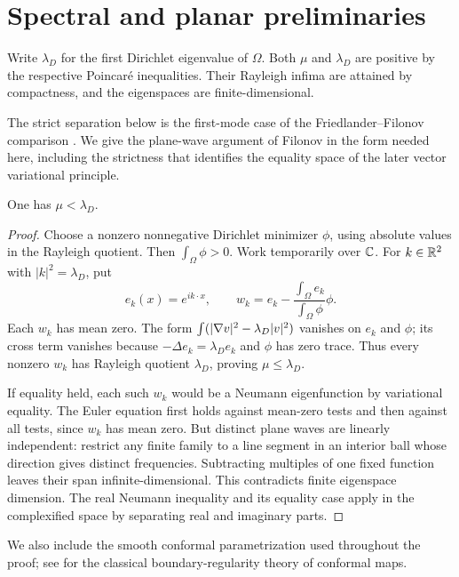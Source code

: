 \section{Spectral and planar preliminaries}\label{sec:preliminaries}

Write $\lambda_D$ for the first Dirichlet eigenvalue of $\Omega$. Both $\mu$ and $\lambda_D$ are positive by the respective Poincar\'e inequalities. Their Rayleigh infima are attained by compactness, and the eigenspaces are finite-dimensional.

The strict separation below is the first-mode case of the Friedlander--Filonov comparison \cite{Friedlander1991,Filonov2005}. We give the plane-wave argument of Filonov in the form needed here, including the strictness that identifies the equality space of the later vector variational principle.

\begin{lemma}\label{lem:gap}
One has $\mu<\lambda_D$.
\end{lemma}
\begin{proof}
Choose a nonzero nonnegative Dirichlet minimizer $\phi$, using absolute values in the Rayleigh quotient. Then $\int_\Omega\phi>0$. Work temporarily over $\mathbb C$. For $k\in\mathbb R^2$ with $|k|^2=\lambda_D$, put
\[
e_k(x)=e^{ik\cdot x},\qquad
w_k=e_k-\frac{\int_\Omega e_k}{\int_\Omega\phi}\phi.
\]
Each $w_k$ has mean zero. The form $\int(|\nabla v|^2-\lambda_D|v|^2)$ vanishes on $e_k$ and $\phi$; its cross term vanishes because $-\Delta e_k=\lambda_De_k$ and $\phi$ has zero trace. Thus every nonzero $w_k$ has Rayleigh quotient $\lambda_D$, proving $\mu\le\lambda_D$.

If equality held, each such $w_k$ would be a Neumann eigenfunction by variational equality. The Euler equation first holds against mean-zero tests and then against all tests, since $w_k$ has mean zero. But distinct plane waves are linearly independent: restrict any finite family to a line segment in an interior ball whose direction gives distinct frequencies. Subtracting multiples of one fixed function leaves their span infinite-dimensional. This contradicts finite eigenspace dimension. The real Neumann inequality and its equality case apply in the complexified space by separating real and imaginary parts.
\end{proof}

We also include the smooth conformal parametrization used throughout the proof; see \cite{Pommerenke1992} for the classical boundary-regularity theory of conformal maps.

